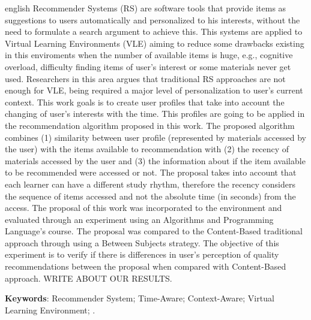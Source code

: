 \begin{resumo}[Abstract]
 \begin{otherlanguage*}{english}
  	Recommender Systems (RS) are software tools that provide items as suggestions to users automatically and personalized to his
    interests, without the need to formulate a search argument to achieve this. This systems are applied to Virtual Learning
    Environments (VLE) aiming to reduce some drawbacks existing in this enviroments when the number of available items is
    huge, e.g., cognitive overload, difficulty finding items of user's interest or some materials never get used. Researchers
    in this area argues that traditional RS approaches are not enough for VLE, being required a major level of personalization
    to user's current context. This work goals is to create user profiles that take into account the changing of user's interests
    with the time. This profiles are going to be applied in the recommendation algorithm proposed in this work. The proposed
    algorithm combines (1) similarity between user profile (represented by materials accessed by the user) with the items
    available to recommendation with (2) the recency of materials accessed by the user and (3) the information about if
    the item available to be recommended were accessed or not. The proposal takes into account that each learner can have
    a different study rhythm, therefore the recency considers the sequence of items accessed and not the absolute time (in
    seconds) from the access. The proposal of this work was incorporated to the \adaptwebspace environment and evaluated
    through an experiment using an Algorithms and Programming Language's course. The proposal was compared to the Content-Based traditional approach
    through using a Between Subjects strategy. The objective of this experiment is to verify if there is differences
    in user's perception of quality recommendations between the proposal when compared with Content-Based approach.
    WRITE ABOUT OUR RESULTS.
    \vspace{\onelineskip}

    \noindent
    \textbf{Keywords}: Recommender System; Time-Aware; Context-Aware; Virtual Learning Environment; \adaptweb.
 \end{otherlanguage*}
\end{resumo}

\listoffigures*
\cleardoublepage

\listoftables*
\cleardoublepage